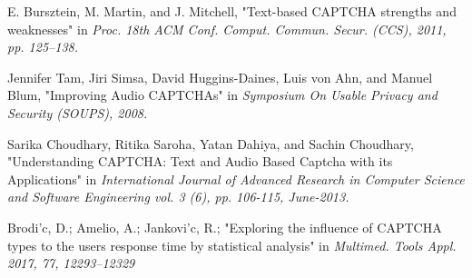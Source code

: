 \begin{thebibliography}{9}
 E. Bursztein, M. Martin, and J. Mitchell, "Text-based CAPTCHA strengths and weaknesses" in \emph{Proc. 18th ACM Conf. Comput. Commun. Secur. (CCS), 2011, pp. 125–138.}

 Jennifer Tam, Jiri Simsa, David Huggins-Daines, Luis von Ahn, and Manuel Blum, "Improving Audio CAPTCHAs" in \emph{Symposium On Usable Privacy and Security (SOUPS), 2008.}

 Sarika Choudhary, Ritika Saroha, Yatan Dahiya, and Sachin Choudhary, "Understanding CAPTCHA: Text and Audio Based Captcha with its Applications" in \emph{International Journal of Advanced Research in Computer Science and Software Engineering vol. 3 (6), pp. 106-115, June-2013.}

 Brodi'c, D.; Amelio, A.; Jankovi'c, R.; "Exploring the influence of CAPTCHA types to the users response time by statistical analysis" in \emph{Multimed. Tools Appl. 2017, 77, 12293–12329}

\end{thebibliography}